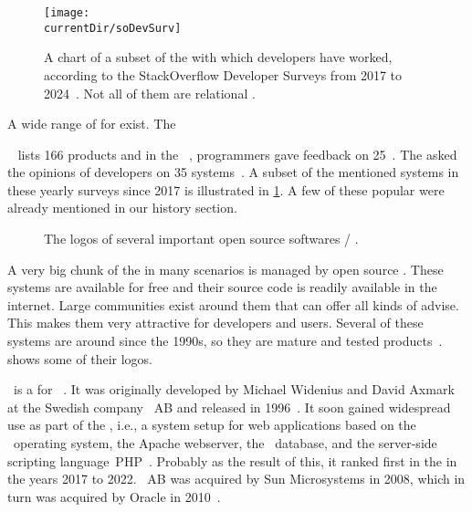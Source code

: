 %
\label{sec:software}%
\FloatBarrier%
%
\begin{figure}%
\centering%
\texttt{[image: \\currentDir/soDevSurv]}%
\caption{A chart of a subset of the  with which developers have worked, according to the StackOverflow Developer Surveys from 2017 to 2024~\cite{SE:SO:2024DS}. %
Not all of them are relational .}%
\label{fig:soDevSurv}%
\end{figure}%
%
A wide range of  for  exist.
The \begin{noglslink}\end{noglslink}~\cite{RS2025DERORD} lists 166 products and in the ~\cite{SE:SO:2024DS}, programmers gave feedback on 25~.
The  asked the opinions of developers on 35 systems~\cite{SE:SO:2024DS}.
A subset of the mentioned systems in these yearly surveys since 2017 is illustrated in \cref{fig:soDevSurv}.
A few of these popular  were already mentioned in our history section.%
%
%
\begin{figure}%
\centering%
%
%
%
\floatSep%
%
%
%
\floatSep%
%
%
%
\floatRowSep%
%
%
%
\caption{The logos of several important open source softwares / .}%
\label{fig:ossDBlogos}%
%
\end{figure}%
%
A very big chunk of the  in many scenarios is managed by open source .
These systems are available for free and their source code is readily available in the internet.
Large communities exist around them that can offer all kinds of advise.
This makes them very attractive for developers and users.
Several of these systems are around since the 1990s, so they are mature and tested products~\cite{C20245YOQ}.
 shows some of their logos.

\mysql\ is a  for ~\cite{WAM2002MRMDFTS,TA2024DDAMWPAM,BT2021HPM,RGS2021BTOTONAMDFPC,D2015LMAM}.
It was originally developed by Michael Widenius and David Axmark at the Swedish company \mysql~AB and released in 1996~\cite{C20245YOQ}.
It soon gained widespread use as part of the \lampStack, i.e., a system setup for web applications based on the \linux\ operating system, the Apache webserver, the \mysql\ database, and the server-side scripting language~PHP~\cite{C2022HAFTLS,H2020ULU2E}.
Probably as the result of this, it ranked first in the  in the years 2017 to 2022.
\mysql~AB was acquired by Sun Microsystems in 2008, which in turn was acquired by Oracle in 2010~\cite{C20245YOQ}.

